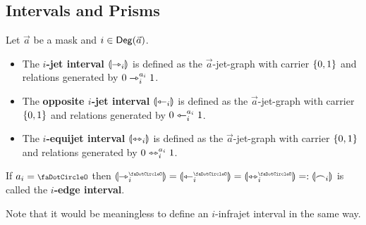 \documentclass[a4paper]{memoir}
\begin{document}
\subsection{Intervals and Prisms}
\begin{definition} \label{def:interval}
	Let $\vec a$ be a mask and $i \in {\mathsf{Deg}}(\vec a)$.
	\begin{itemize}
		\item The \textbf{$i$-jet interval} ${\llparenthesis \rightarrowtriangle_i \rrparenthesis}$ is defined as the $\vec a$-jet-graph with carrier $\mathopen{}\left\{ 0, 1 \right\}\mathclose{}$ and relations generated by $0 \rightarrowtriangle_i^{a_i} 1$.
		\item The \textbf{opposite $i$-jet interval} ${\llparenthesis \leftarrowtriangle_i \rrparenthesis}$ is defined as the $\vec a$-jet-graph with carrier $\mathopen{}\left\{ 0, 1 \right\}\mathclose{}$ and relations generated by $0 \leftarrowtriangle_i^{a_i} 1$.
		\item The \textbf{$i$-equijet interval} ${\llparenthesis \leftrightarrowtriangle_i \rrparenthesis}$ is defined as the $\vec a$-jet-graph with carrier $\mathopen{}\left\{ 0, 1 \right\}\mathclose{}$ and relations generated by $0 \leftrightarrowtriangle_i^{a_i} 1$.
	\end{itemize}
	If $a_i = \npolar$ then $\rival{\jet_i^\npolar} = \rival{\tej_i^\npolar} = \rival{\equijet_i^\npolar} =: \rival{\edge_i}$ is called the \textbf{$i$-edge interval}.
\end{definition}
Note that it would be meaningless to define an $i$-infrajet interval in the same way.
\end{document}
